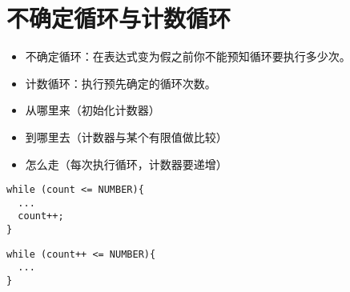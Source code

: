 \section{不确定循环与计数循环}
\begin{frame}[fragile]\ft{\secname}
\begin{itemize}
\item 不确定循环：在表达式变为假之前你不能预知循环要执行多少次。\\[0.1in]
\item 计数循环：执行预先确定的循环次数。
\end{itemize}
\end{frame}


\begin{frame}[fragile]\ft{\secname}



\end{frame}

\begin{frame}[fragile]
\begin{itemize}
\item 从哪里来（初始化计数器）\\[0.1in]
\item 到哪里去（计数器与某个有限值做比较）\\[0.1in]
\item 怎么走（每次执行循环，计数器要递增）
\end{itemize}
\end{frame}

\begin{frame}[fragile]
\begin{lstlisting}
while (count <= NUMBER){
  ...
  count++;
}
\end{lstlisting}

\begin{lstlisting}
while (count++ <= NUMBER){
  ...
}
\end{lstlisting}
\end{frame}


